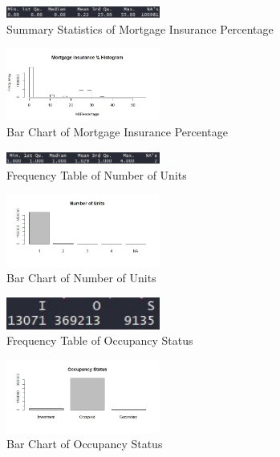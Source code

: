 \documentclass[10pt,twocolumn,letterpaper]{article}
\begin{document}
\begin{figure}
	\includegraphics[width=0.45\textwidth]{images/MIS.JPG}
	\caption{Summary Statistics of Mortgage Insurance Percentage}
	\label{fig:MIS}
\end{figure}
\begin{figure}
	\includegraphics[width=0.45\textwidth]{images/MIB.jpeg}
	\caption{Bar Chart of Mortgage Insurance Percentage}
	\label{fig:MIB}
\end{figure}

\begin{figure}
	\includegraphics[width=0.45\textwidth]{images/NOUS.JPG}
	\caption{Frequency Table of Number of Units}
	\label{fig:NOUS}
\end{figure}
\begin{figure}
	\includegraphics[width=0.45\textwidth]{images/NOUB.jpeg}
	\caption{Bar Chart of Number of Units}
	\label{fig:NOUB}
\end{figure}

\begin{figure}
	\includegraphics[width=0.45\textwidth]{images/OccS.JPG}
	\caption{Frequency Table of Occupancy Status}
	\label{fig:OccS}
\end{figure}
\begin{figure}
	\includegraphics[width=0.45\textwidth]{images/OccB.jpeg}
	\caption{Bar Chart of Occupancy Status}
	\label{fig:OccB}
\end{figure}
\end{document}
